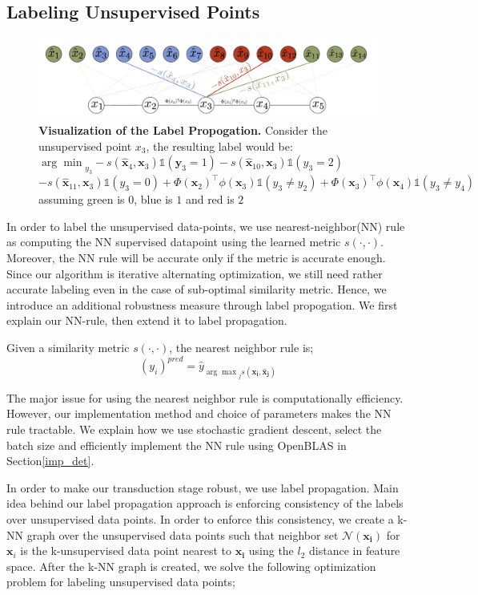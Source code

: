 \subsection{Labeling Unsupervised Points}
\label{label}
\begin{figure}[ht]
\includegraphics[width=\columnwidth]{figure1}
\caption{\textbf{Visualization of the Label Propogation.} Consider the unsupervised point $x_3$, the  resulting label would be:
\mbox{ ${\arg\min}_{y_3} -s(\hat{\mathbf{x}}_4,\mathbf{x}_3)\mathds{1}(\mathbf{y}_3=1) -s(\hat{\mathbf{x}}_{10},\mathbf{x}_3)\mathds{1}(y_3=2)$} $ -s(\hat{\mathbf{x}}_{11},\mathbf{x}_3)\mathds{1}(y_3=0) + \Phi(\mathbf{x}_2)^\intercal\phi(\mathbf{x}_3)\mathds{1}(y_3 \neq y_2) +\Phi(\mathbf{x}_3)^\intercal\phi(\mathbf{x}_4)\mathds{1}(y_3 \neq y_4) $ assuming green is $0$, blue is $1$ and red is $2$}
\label{vis_label_prop}
\end{figure}
In order to label the unsupervised data-points, we use nearest-neighbor(NN) rule as computing the NN supervised datapoint using the learned metric $s(\cdot,\cdot)$. Moreover, the NN rule will be accurate only if the metric is accurate enough. Since our algorithm is iterative alternating optimization, we still need rather accurate labeling even in the case of sub-optimal similarity metric. Hence, we introduce an additional robustness measure through label propogation. We first explain our NN-rule, then extend it to label propagation.

Given a similarity metric $s(\cdot,\cdot)$, the nearest neighbor rule is;
\begin{equation}
(y_i)^{pred} = \hat{y}_{{\arg\max}_j s(\mathbf{x_i}, \mathbf{\hat{x}_j})}
\end{equation}

The major issue for using the nearest neighbor rule is computationally efficiency. However, our implementation method and choice of parameters makes the NN rule tractable. We explain how we use stochastic gradient descent, select the batch size and efficiently implement the NN rule using OpenBLAS in Section\ref{imp_det}. 

In order to make our transduction stage robust, we use label propagation. Main idea behind our label propagation approach is enforcing consistency of the labels over unsupervised data points. In order to enforce this consistency, we create a k-NN graph over the unsupervised data points such that neighbor set $\mathcal{N}(\mathbf{x_i})$ for $\mathbf{x}_i$ is the k-unsupervised data point nearest to $\mathbf{x_i}$ using the $l_2$ distance in feature space. After the k-NN graph is created, we solve the following optimization problem for labeling unsupervised data points;

